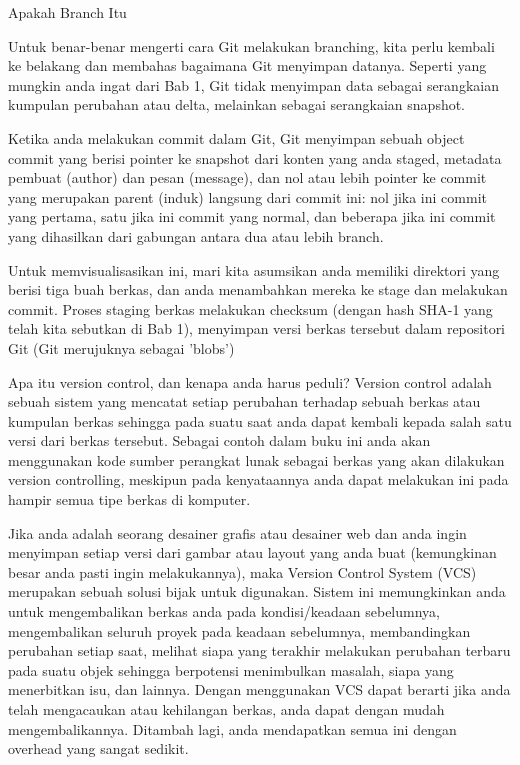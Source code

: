 \vspace{14pt}
\noindent 
{\fontsize{14pt}{14pt}\selectfont Apakah Branch Itu \\} \par
\noindent 
{\fontsize{14pt}{14pt}\selectfont Untuk benar-benar mengerti cara Git melakukan branching, kita perlu kembali ke belakang dan membahas bagaimana Git menyimpan datanya. Seperti yang mungkin anda ingat dari Bab 1, Git tidak menyimpan data sebagai serangkaian kumpulan perubahan atau delta, melainkan sebagai serangkaian snapshot. \\} \par
\noindent 
{\fontsize{14pt}{14pt}\selectfont Ketika anda melakukan commit dalam Git, Git menyimpan sebuah object commit yang berisi pointer ke snapshot dari konten yang anda staged, metadata pembuat (author) dan pesan (message), dan nol atau lebih pointer ke commit yang merupakan parent (induk) langsung dari commit ini: nol jika ini commit yang pertama, satu jika ini commit yang normal, dan beberapa jika ini commit yang dihasilkan dari gabungan antara dua atau lebih branch. \\} \par
\noindent 
{\fontsize{14pt}{14pt}\selectfont Untuk memvisualisasikan ini, mari kita asumsikan anda memiliki direktori yang berisi tiga buah berkas, dan anda menambahkan mereka ke stage dan melakukan commit. Proses staging berkas melakukan checksum (dengan hash SHA-1 yang telah kita sebutkan di Bab 1), menyimpan versi berkas tersebut dalam repositori Git (Git merujuknya sebagai 'blobs') \\} \par
\noindent 
{\fontsize{14pt}{14pt}\selectfont Apa itu version control, dan kenapa anda harus peduli? Version control adalah sebuah sistem yang mencatat setiap perubahan terhadap sebuah berkas atau kumpulan berkas sehingga pada suatu saat anda dapat kembali kepada salah satu versi dari berkas tersebut. Sebagai contoh dalam buku ini anda akan menggunakan kode sumber perangkat lunak sebagai berkas yang akan dilakukan version controlling, meskipun pada kenyataannya anda dapat melakukan ini pada hampir semua tipe berkas di komputer. \\} \par
\noindent 
{\fontsize{14pt}{14pt}\selectfont Jika anda adalah seorang desainer grafis atau desainer web dan anda ingin menyimpan setiap versi dari gambar atau layout yang anda buat (kemungkinan besar anda pasti ingin melakukannya), maka Version Control System (VCS) merupakan sebuah solusi bijak untuk digunakan. Sistem ini memungkinkan anda untuk mengembalikan berkas anda pada kondisi/keadaan sebelumnya, mengembalikan seluruh proyek pada keadaan sebelumnya, membandingkan perubahan setiap saat, melihat siapa yang terakhir melakukan perubahan terbaru pada suatu objek sehingga berpotensi menimbulkan masalah, siapa yang menerbitkan isu, dan lainnya. Dengan menggunakan VCS dapat berarti jika anda telah mengacaukan atau kehilangan berkas, anda dapat dengan mudah mengembalikannya. Ditambah lagi, anda mendapatkan semua ini dengan overhead yang sangat sedikit. \\} \par

